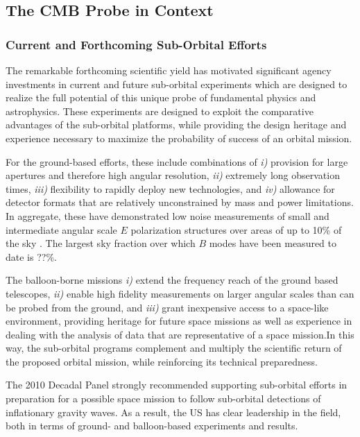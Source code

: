 
\subsection{The CMB Probe in Context}
\label{sec:spacemission}

\vspace{-0.05in}

\subsubsection{Current and Forthcoming Sub-Orbital Efforts}

The remarkable forthcoming scientific yield has motivated significant agency investments 
in current and future sub-orbital experiments which are designed to realize the full potential of this
unique probe of fundamental physics and astrophysics.    These experiments are designed 
to exploit the comparative advantages of the sub-orbital platforms, while providing the design heritage and 
experience necessary to maximize the probability of success of an orbital mission. 

For the ground-based efforts, these include combinations of {\it i)}
provision for large apertures and therefore high angular
resolution, {\it ii)} extremely long observation times, {\it iii)}
flexibility to rapidly deploy new technologies, and {\it iv)}
allowance for detector formats that are relatively unconstrained by
mass and power limitations.  In aggregate, these have demonstrated low
noise measurements of small and intermediate angular scale $E$ polarization 
structures over areas of up to 10\% of the sky . The largest sky fraction 
over which $B$ modes have been measured to date is ??\%. 

The balloon-borne missions {\it i)} extend the frequency reach of the ground based telescopes, 
{\it ii)} enable high fidelity measurements on larger angular scales than can be probed from the 
ground, and {\it iii)} grant inexpensive access to a space-like environment, providing heritage 
for future space missions as well as experience in dealing with the analysis of data that 
are representative of a space mission.In this way, the sub-orbital programs complement and 
multiply the scientific return of the proposed orbital mission, while reinforcing its technical 
preparedness.  

The 2010 Decadal Panel strongly recommended supporting sub-orbital efforts in preparation 
for a possible space mission to follow sub-orbital detections of inflationary gravity waves. 
As a result, the US has clear leadership in the field, both in terms of ground- and balloon-based 
experiments and results. 

